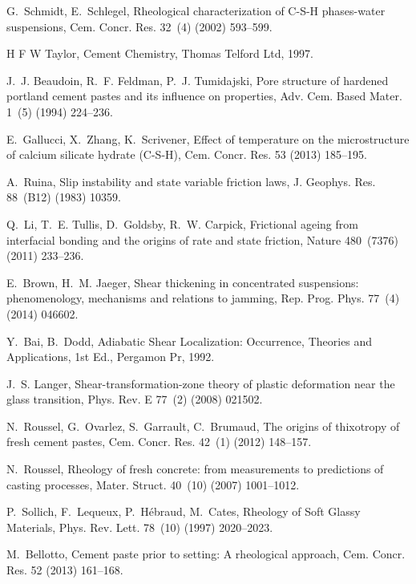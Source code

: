 \documentclass[final,5p,twocolumn]{elsarticle}
\begin{document}
G.~Schmidt, E.~Schlegel, Rheological characterization of {C}-{S}-{H}
  phases-water suspensions, Cem. Concr. Res. 32~(4) (2002) 593--599.

{H F W Taylor}, Cement {Chemistry}, Thomas Telford Ltd, 1997.

J.~J. Beaudoin, R.~F. Feldman, P.~J. Tumidajski, Pore structure of hardened
  portland cement pastes and its influence on properties, Adv. Cem. Based
  Mater. 1~(5) (1994) 224--236.

E.~Gallucci, X.~Zhang, K.~Scrivener, Effect of temperature on the
  microstructure of calcium silicate hydrate ({C}-{S}-{H}), Cem. Concr. Res. 53
  (2013) 185--195.

A.~Ruina, Slip instability and state variable friction laws, J. Geophys. Res.
  88~(B12) (1983) 10359.

Q.~Li, T.~E. Tullis, D.~Goldsby, R.~W. Carpick, Frictional ageing from
  interfacial bonding and the origins of rate and state friction, Nature
  480~(7376) (2011) 233--236.

E.~Brown, H.~M. Jaeger, Shear thickening in concentrated suspensions:
  phenomenology, mechanisms and relations to jamming, Rep. Prog. Phys. 77~(4)
  (2014) 046602.

Y.~Bai, B.~Dodd, Adiabatic {Shear} {Localization}: {Occurrence}, {Theories} and
  {Applications}, 1st Ed., Pergamon Pr, 1992.

J.~S. Langer, Shear-transformation-zone theory of plastic deformation near the
  glass transition, Phys. Rev. E 77~(2) (2008) 021502.

N.~Roussel, G.~Ovarlez, S.~Garrault, C.~Brumaud, The origins of thixotropy of
  fresh cement pastes, Cem. Concr. Res. 42~(1) (2012) 148--157.

N.~Roussel, Rheology of fresh concrete: from measurements to predictions of
  casting processes, Mater. Struct. 40~(10) (2007) 1001--1012.

P.~Sollich, F.~Lequeux, P.~H{\'{e}}braud, M.~Cates, Rheology of {Soft} {Glassy}
  {Materials}, Phys. Rev. Lett. 78~(10) (1997) 2020--2023.

M.~Bellotto, Cement paste prior to setting: {A} rheological approach, Cem.
  Concr. Res. 52 (2013) 161--168.
\end{document}
